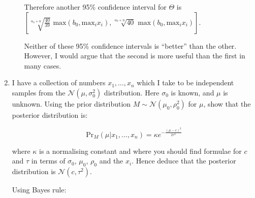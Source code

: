 \documentclass[10pt,\jkfside,a4paper]{article}
\begin{document}
\begin{enumerate}
\begin{enumerate}[label=(\alph*)]
Therefore another 95\% confidence interval for $\Theta$ is
$\left[\sqrt[\alpha_0 + n]{\frac{40}{39}}\text{ max}\left(b_0, \text{max}_i
x_i\right), \sqrt[\alpha_0 +
n]{40}\text{ max}\left(b_0, \text{max}_i x_i\right)\right]$.

Neither of these 95\% confidence intervals is ``better'' than the other.
However, I would argue that the second is more useful than the first in
many cases.

\end{enumerate}

\item I have a collection of numbers $x_1, \dots, x_n$ which I take to be
independent samples from the $\mathcal{N}(\mu, \sigma_0^2)$ distribution.
Here $\sigma_0$ is known, and $\mu$ is unknown. Using the prior distribution
$M \sim \mathcal{N}(\mu_0, \rho_0^2)$ for $\mu$, show that the posterior
distribution is:

\[
\text{Pr}_M(\mu | x_1, \dots, x_n) = \kappa e^{-\frac{(\mu - c)^2}{2\tau^2}}
\]

where $\kappa$ is a normalising constant and where you should find formulae
for $c$ and $\tau$ in terms of $\sigma_0$, $\mu_0$, $\rho_0$ and the $x_i$.
Hence deduce that the posterior distribution is $\mathcal{N}(c, \tau^2)$.

Using Bayes rule:


\end{enumerate}
\end{document}
